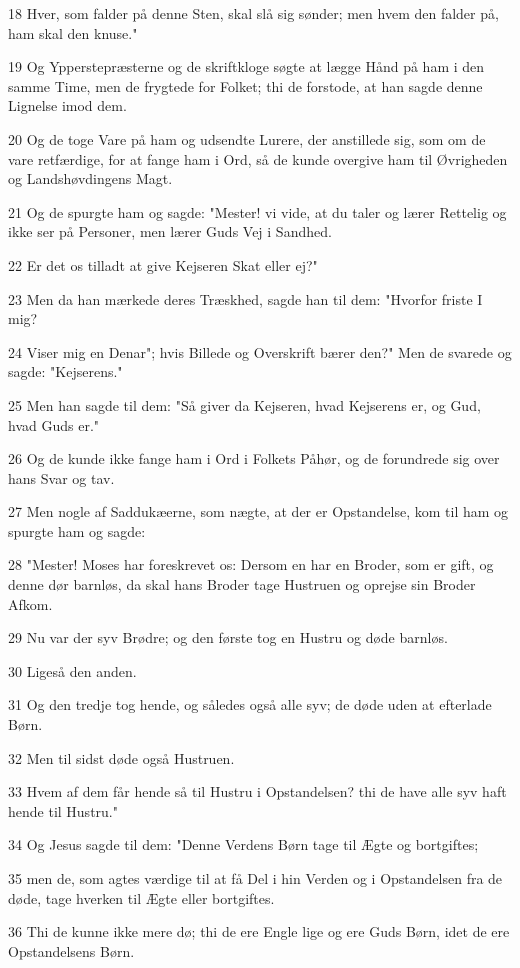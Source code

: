 \par 18 Hver, som falder på denne Sten, skal slå sig sønder; men hvem den falder på, ham skal den knuse."
\par 19 Og Ypperstepræsterne og de skriftkloge søgte at lægge Hånd på ham i den samme Time, men de frygtede for Folket; thi de forstode, at han sagde denne Lignelse imod dem.
\par 20 Og de toge Vare på ham og udsendte Lurere, der anstillede sig, som om de vare retfærdige, for at fange ham i Ord, så de kunde overgive ham til Øvrigheden og Landshøvdingens Magt.
\par 21 Og de spurgte ham og sagde: "Mester! vi vide, at du taler og lærer Rettelig og ikke ser på Personer, men lærer Guds Vej i Sandhed.
\par 22 Er det os tilladt at give Kejseren Skat eller ej?"
\par 23 Men da han mærkede deres Træskhed, sagde han til dem: "Hvorfor friste I mig?
\par 24 Viser mig en Denar"; hvis Billede og Overskrift bærer den?" Men de svarede og sagde: "Kejserens."
\par 25 Men han sagde til dem: "Så giver da Kejseren, hvad Kejserens er, og Gud, hvad Guds er."
\par 26 Og de kunde ikke fange ham i Ord i Folkets Påhør, og de forundrede sig over hans Svar og tav.
\par 27 Men nogle af Saddukæerne, som nægte, at der er Opstandelse, kom til ham og spurgte ham og sagde:
\par 28 "Mester! Moses har foreskrevet os: Dersom en har en Broder, som er gift, og denne dør barnløs, da skal hans Broder tage Hustruen og oprejse sin Broder Afkom.
\par 29 Nu var der syv Brødre; og den første tog en Hustru og døde barnløs.
\par 30 Ligeså den anden.
\par 31 Og den tredje tog hende, og således også alle syv; de døde uden at efterlade Børn.
\par 32 Men til sidst døde også Hustruen.
\par 33 Hvem af dem får hende så til Hustru i Opstandelsen? thi de have alle syv haft hende til Hustru."
\par 34 Og Jesus sagde til dem: "Denne Verdens Børn tage til Ægte og bortgiftes;
\par 35 men de, som agtes værdige til at få Del i hin Verden og i Opstandelsen fra de døde, tage hverken til Ægte eller bortgiftes.
\par 36 Thi de kunne ikke mere dø; thi de ere Engle lige og ere Guds Børn, idet de ere Opstandelsens Børn.
